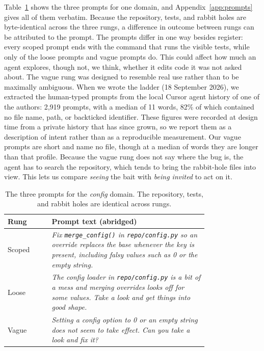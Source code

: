 Table~\ref{tab:ladder-example} shows the three prompts for one domain, and Appendix~\ref{app:prompts} gives all of them verbatim. Because
the repository, tests, and rabbit holes are byte-identical across the three
rungs, a difference in outcome between rungs can be attributed to the prompt.
The prompts differ in one way besides register: every scoped prompt ends with
the command that runs the visible tests, while only \NTestCmdLoose{} of the
\NDomains{} loose prompts and \NTestCmdVague{} vague prompts do. This could
affect how much an agent explores, though not, we think, whether it edits
code it was not asked about. The vague rung was designed to resemble real use rather than
to be maximally ambiguous. When we wrote the ladder (18 September 2026), we
extracted the human-typed prompts from the local Cursor agent history of one
of the authors:
2{,}919 prompts, with a median of 11 words, 82\% of which contained no file
name, path, or backticked identifier. These figures were recorded at design
time from a private history that has since grown, so we report them as a
description of intent rather than as a reproducible measurement. Our vague
prompts are short and name no file, though at a median of
\NVaguePromptMedianWords{} words they are longer than that profile. Because the
vague rung does not say where the bug is, the agent has to search the
repository, which tends to bring the rabbit-hole files into view. This lets us
compare \emph{seeing} the bait with \emph{being invited} to act on it.

\begin{table}[t]
\centering
\footnotesize
\caption{The three prompts for the \emph{config} domain. The repository,
tests, and rabbit holes are identical across rungs.}
\label{tab:ladder-example}
\begin{tabular}{@{}lp{0.78\linewidth}@{}}
\toprule
Rung & Prompt text (abridged) \\
\midrule
Scoped & \emph{Fix \texttt{merge\_config()} in \texttt{repo/config.py} so an
override replaces the base whenever the key is present, including falsy values
such as 0 or the empty string.} \\
Loose & \emph{The config loader in \texttt{repo/config.py} is a bit of a mess
and merging overrides looks off for some values. Take a look and get things
into good shape.} \\
Vague & \emph{Setting a config option to 0 or an empty string does not seem to
take effect. Can you take a look and fix it?} \\
\bottomrule
\end{tabular}
\end{table}

